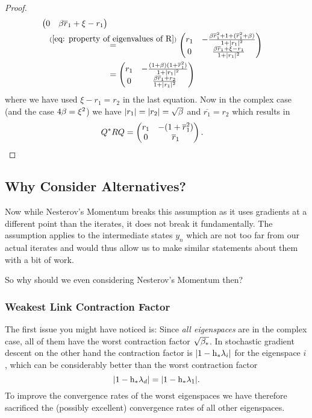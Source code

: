 \begin{proof}
\begin{align*}
\begin{pmatrix}
			0 &  \momCoeff\overline{r}_1 + \xi - r_1
		\end{pmatrix}\\
		&\lxeq{(\ref{eq: property of eigenvalues of R})}\begin{pmatrix}
			r_1
			& -\frac{\momCoeff \overline{r}_1^2 + 1+ (\overline{r}_1^2 + \momCoeff)}{1+|r_1|^2} \\
			0 &  \frac{\momCoeff\overline{r}_1 + \xi - r_1}{1+|r_1|^2}
		\end{pmatrix}\\
		&=\begin{pmatrix}
			r_1
			& -\frac{(1+\momCoeff)(1+\overline{r}_1^2)}{1+|r_1|^2} \\
			0 &  \frac{\momCoeff\overline{r}_1 + r_2}{1+|r_1|^2}
		\end{pmatrix}
	\end{align*}
	where we have used \(\xi - r_1 = r_2\) in the last equation. Now in the complex
	case (and the case \(4\beta = \xi^2\)) we have
	\(|r_1|=|r_2|=\sqrt{\beta}\) and \(\overline{r_1} = r_2\) which results
	in
	\begin{align*}
		Q^* R Q
		&=\begin{pmatrix}
			r_1
			& -(1+\overline{r}_1^2) \\
			0 & \overline{r}_1 
		\end{pmatrix}.
		\qedhere
	\end{align*}
\end{proof}



\subsection{Why Consider Alternatives?}

Now while Nesterov's Momentum breaks this assumption as it uses gradients at a
different point than the iterates, it does not break it fundamentally. The
assumption applies to the intermediate states \(y_n\) which are not too far
from our actual iterates and would thus allow us to make similar statements
about them with a bit of work.

So why should we even considering Nesterov's Momentum then?

\subsubsection{Weakest Link Contraction Factor}

The first issue you
might have noticed is: Since \emph{all eigenspaces} are in the complex case,
all of them have the worst contraction factor \(\sqrt{\beta_*}\). In stochastic
gradient descent on the other hand the contraction factor is \(|1-\text{h}_*\lambda_i|\)
for the eigenspace \(i\), which can be considerably better than the worst
contraction factor 
\[|1-\text{h}_*\lambda_d|=|1-\text{h}_*\lambda_1|.\]
To improve the convergence rates of the worst eigenspaces we have therefore
sacrificed the (possibly excellent) convergence rates of all other eigenspaces.


